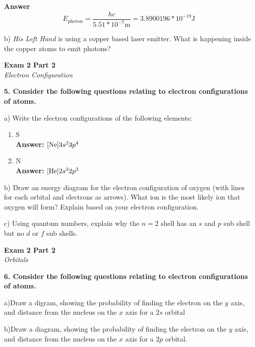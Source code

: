 \documentclass{article}
\begin{document}
    \textbf{Answer}\\
    $$ E_{\text{photon}} = \dfrac{hc}{5.51 * 10^{-7} \si{\meter}} = 3.8900196 * 10^{-19} \si{\joule} $$

    b) \textit{His Left Hand} is using a copper based laser emitter. What is happening inside the copper atoms to emit photons?

    \pagebreak

    \begin{center}
        \textbf{Exam 2 Part 2}\\
        \textit{Electron Configuration}
    \end{center}
    \textbf{5. Consider the following questions relating to electron configurations of atoms.}

    a) Write the electron configurations of the following elements:
    \begin{enumerate}
        \item S\\
        \textbf{Answer: }
        $[\ce{Ne}]3s^{2}3p^{4}$
        \item N\\
        \textbf{Answer: }
        $[\ce{He}]2s^{2}2p^{3}$
    \end{enumerate}

    b) Draw an energy diagram for the electron configuration of oxygen (with lines for each orbital and electrons as arrows). What ion is the most likely ion that oxygen will form? Explain based on your electron configuration.

    c) Using quantum numbers, explain why the $n = 2$ shell has an $s$ and $p$ sub shell but no $d$ or $f$ sub shells.
    \pagebreak

    \begin{center}
        \textbf{Exam 2 Part 2}\\
        \textit{Orbitals}
    \end{center}
    \textbf{6. Consider the following questions relating to electron configurations of atoms.}

    a)Draw a digram, showing the probability of finding the electron on the $y$ axis, and distance from the nucleus on the $x$ axis for a $2s$ orbital

    b)Draw a diagram, showing the probability of finding the electron on the $y$ axis, and distance from the nucleus on the $x$ axis for a $2p$ orbital.
\end{document}
